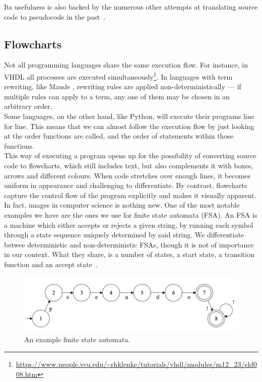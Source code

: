 Its usefulness is also backed by the numerous other attempts at translating source code to pseudocode in the past~\cite{PSEU:/Kreher/Stinson, DBLP:conf/aswec/AlhefdhiDHG18}.

\subsection{Flowcharts}

Not all programming languages share the same execution flow. For instance, in VHDL all processes are executed simultaneously\footnote{\url{https://www.people.vcu.edu/~rhklenke/tutorials/vhdl/modules/m12\_23/sld008.htm}}. In languages with term rewriting, like Maude \cite{principlesOfMaude}, rewriting rules are applied non-deterministically --- if multiple rules can apply to a term, any one of them may be chosen in an arbitrary order. \hfill \\

Some languages, on the other hand, like Python, will execute their programs line for line. This means that we can almost follow the execution flow by just looking at the order functions are called, and the order of statements within those functions. \hfill \\

This way of executing a program opens up for the possibility of converting source code to flowcharts, which still includes text, but also complements it with boxes, arrows and different colours. When code stretches over enough lines, it becomes uniform in appearance and challenging to differentiate. By contrast, flowcharts capture the control flow of the program explicitly and makes it visually apparent. \hfill \\

In fact, images in computer science is nothing new. One of the most notable examples we have are the ones we use for finite state automata (FSA). An FSA is a machine which either accepts or rejects a given string, by running each symbol through a state sequence uniquely determined by said string. We differentiate betwee deterministic and non-deterministic FSAs, though it is not of importance in our context. What they share, is a number of states, a start state, a transition function and an accept state~\cite{introToAutomataTheory}. \hfill \\

\begin{figure}[ht]
    \centering
    \includegraphics[scale=0.46]{assets/dfa.png}
    \caption{An example finite state automata.}
    \label{fig:dfa}
\end{figure}

